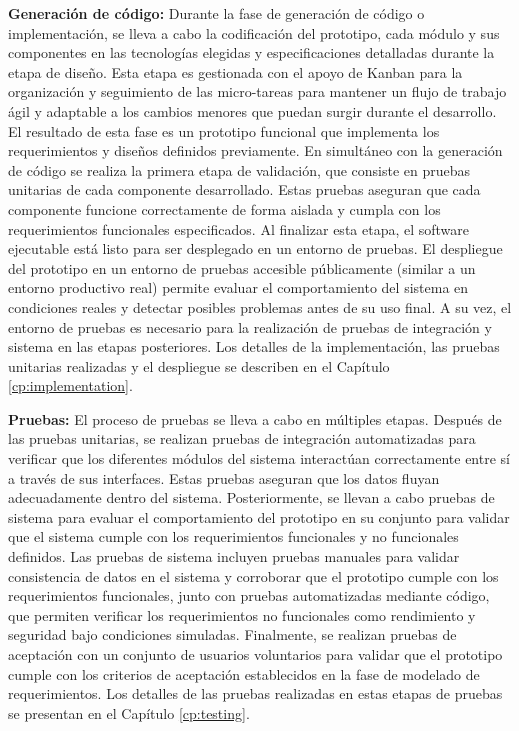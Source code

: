 \textbf{Generación de código:}
Durante la fase de generación de código o implementación, se lleva a cabo la codificación del prototipo, cada módulo y sus componentes en las tecnologías elegidas y especificaciones detalladas durante la etapa de diseño.
Esta etapa es gestionada con el apoyo de Kanban para la organización y seguimiento de las micro-tareas para mantener un flujo de trabajo ágil y adaptable a los cambios menores que puedan surgir durante el desarrollo.
El resultado de esta fase es un prototipo funcional que implementa los requerimientos y diseños definidos previamente.
En simultáneo con la generación de código se realiza la primera etapa de validación, que consiste en pruebas unitarias de cada componente desarrollado.
Estas pruebas aseguran que cada componente funcione correctamente de forma aislada y cumpla con los requerimientos funcionales especificados.
Al finalizar esta etapa, el software ejecutable está listo para ser desplegado en un entorno de pruebas. El despliegue del prototipo en un entorno de pruebas accesible públicamente (similar a un entorno productivo real) permite evaluar el comportamiento del sistema en condiciones reales y detectar posibles problemas antes de su uso final. A su vez, el entorno de pruebas es necesario para la realización de pruebas de integración y sistema en las etapas posteriores.
Los detalles de la implementación, las pruebas unitarias realizadas y el despliegue se describen en el Capítulo \ref{cp:implementation}.

\textbf{Pruebas:}
El proceso de pruebas se lleva a cabo en múltiples etapas.
Después de las pruebas unitarias, se realizan pruebas de integración automatizadas para verificar que los diferentes módulos del sistema interactúan correctamente entre sí a través de sus interfaces.
Estas pruebas aseguran que los datos fluyan adecuadamente dentro del sistema.
Posteriormente, se llevan a cabo pruebas de sistema para evaluar el comportamiento del prototipo en su conjunto para validar que el sistema cumple con los requerimientos funcionales y no funcionales definidos.
Las pruebas de sistema incluyen pruebas manuales para validar consistencia de datos en el sistema y corroborar que el prototipo cumple con los requerimientos funcionales, junto con pruebas automatizadas mediante código, que permiten verificar los requerimientos no funcionales como rendimiento y seguridad bajo condiciones simuladas.
Finalmente, se realizan pruebas de aceptación con un conjunto de usuarios voluntarios para validar que el prototipo cumple con los criterios de aceptación establecidos en la fase de modelado de requerimientos.
Los detalles de las pruebas realizadas en estas etapas de pruebas se presentan en el Capítulo \ref{cp:testing}.

